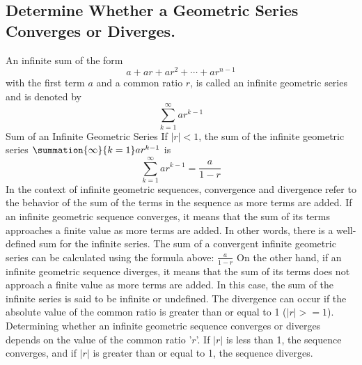 \documentclass{report}
\begin{document}
   \subsection{Determine Whether a Geometric Series Converges or Diverges.}
   \bigbreak \noindent 
   \smallbreak \noindent
   \begin{definition}
        An infinite sum of the form
    \[ a + ar + ar^2 + \cdots + ar^{n-1} \]
    with the first term $a$ and a common ratio $r$, is called an infinite geometric series and is denoted by
    \[ \sum_{k=1}^{\infty} ar^{k-1} \]
    Sum of an Infinite Geometric Series
    If $|r| < 1$, the sum of the infinite geometric series $\summation{\infty}{k=1} ar^{k-1}$ is
    \[ \sum_{k=1}^{\infty} ar^{k-1} = \frac{a}{1-r} \]
    \bigbreak \noindent 
    In the context of infinite geometric sequences, convergence and divergence refer to the behavior of the sum of the terms in the sequence as more terms are added.
    \bigbreak \noindent 
    If an infinite geometric sequence converges, it means that the sum of its terms approaches a finite value as more terms are added. In other words, there is a well-defined sum for the infinite series. The sum of a convergent infinite geometric series can be calculated using the formula above: $\frac{a}{1-r} $
    \bigbreak \noindent 
    On the other hand, if an infinite geometric sequence diverges, it means that the sum of its terms does not approach a finite value as more terms are added. In this case, the sum of the infinite series is said to be infinite or undefined. The divergence can occur if the absolute value of the common ratio is greater than or equal to 1 ($|r| >= 1$).
    \bigbreak \noindent 
    Determining whether an infinite geometric sequence converges or diverges depends on the value of the common ratio '$r$'. If $|r|$ is less than 1, the sequence converges, and if $|r|$ is greater than or equal to 1, the sequence diverges.
   \end{definition}

   \bigbreak \noindent 
\end{document}
